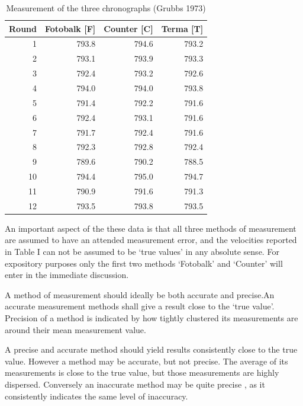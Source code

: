 \documentclass[Chap1main.tex]{subfiles}
\begin{document}
\begin{table}[ht]
\begin{center}
\begin{tabular}{rrrr}
  \hline
  Round& Fotobalk [F] & Counter [C]& Terma [T]\\
  \hline
  1 & 793.8 & 794.6 & 793.2 \\
  2 & 793.1 & 793.9 & 793.3 \\
  3 & 792.4 & 793.2 & 792.6 \\
  4 & 794.0 & 794.0 & 793.8 \\
  5 & 791.4 & 792.2 & 791.6 \\
  6 & 792.4 & 793.1 & 791.6 \\
  7 & 791.7 & 792.4 & 791.6 \\
  8 & 792.3 & 792.8 & 792.4 \\
  9 & 789.6 & 790.2 & 788.5 \\
  10 & 794.4 & 795.0 & 794.7 \\
  11 & 790.9 & 791.6 & 791.3 \\
  12 & 793.5 & 793.8 & 793.5 \\
   \hline
\end{tabular}
\caption{Measurement of the three chronographs (Grubbs 1973)}
\end{center}
\end{table}

An important aspect of the these data is that all three methods of
measurement are assumed to have an attended measurement error, and
the velocities reported in Table I can not be assumed to be `true
values' in any absolute sense. For expository purposes only the
first two methods `Fotobalk' and `Counter' will enter in the
immediate discussion.


A method of measurement should ideally be both accurate and
precise.An accurate measurement methods shall give a result close
to the `true value'. Precision of a method is indicated by how
tightly clustered its measurements are around their mean
measurement value.

\newpage

A precise and accurate method should yield results consistently
close to the true value. However a method may be accurate, but not
precise. The average of its measurements is close to the true
value, but those measurements are highly dispersed. Conversely an
inaccurate method may be quite precise , as it consistently
indicates the same level of inaccuracy.
\end{document}

